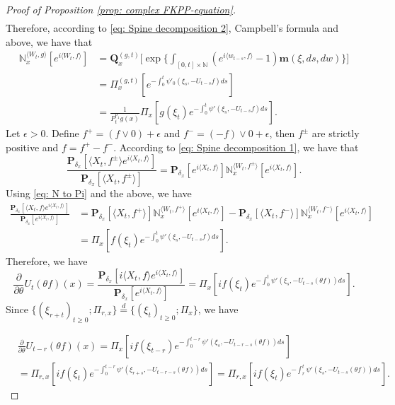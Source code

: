 \documentclass[12pt,a4paper]{amsart}
\theoremstyle{plain}
\theoremstyle{definition}
\numberwithin{equation}{section}
\begin{document}
\begin{proof}[Proof of Proposition \ref{prop: complex FKPP-equation}]
\begin{align}
\end{align}
    Therefore, according to \eqref{eq: Spine decomposition 2}, Campbell's formula and above, we have that
\begin{align}
\label{eq: N to Pi}
    \mathbb N_x^{\langle W_{t}, g\rangle}[e^{i \langle W_t, f\rangle}]
    &=\mathbf Q_x^{(g,t)} \Big[\exp\Big\{\int_{[0,t]\times \mathbb N}(e^{i \langle w_{t-s}, f\rangle} - 1) \mathbf m(\xi, ds,dw)\Big\}\Big]
    \\&= \Pi_x^{(g,t)} [e^{-\int_0^t \psi'_0(\xi_s, -U_{t-s}f)ds}]
    \\&= \frac{1}{P_t^{\rho_1} g (x)} \Pi_x[ g(\xi_t) e^{-\int_0^t \psi'(\xi_s, -U_{t-s}f)ds} ].
\end{align}
    Let $\epsilon >0$.
    Define $f^+ = (f \vee 0) + \epsilon$ and $f^- = (-f) \vee 0 + \epsilon$, then $f^\pm$ are strictly positive and $f = f^+ - f^-$.
    According to \eqref{eq: Spine decomposition 1}, we have that
\begin{equation}
    \frac{\mathbf P_{\delta_x}[\langle X_t,f^{\pm}\rangle e^{i \langle X_t,f\rangle}]}{\mathbf P_{\delta_x}[\langle X_t,f^{\pm}\rangle ]}
    = \mathbf P_{\delta_x}[e^{i \langle X_t,f\rangle}] \mathbb N_x^{\langle W_t,f^{\pm}\rangle}[e^{i \langle X_t,f\rangle}].
\end{equation}
    Using \eqref{eq: N to Pi} and the above, we have
\begin{align}
    \frac{\mathbf P_{\delta_x}[\langle X_t, f\rangle e^{i \langle X_t, f\rangle}] }{\mathbf P_{\delta_x}[e^{i \langle X_t, f\rangle}]}
    &= \mathbf P_{\delta_x}[\langle X_t, f^+\rangle] \mathbb N_x^{\langle W_t, f^+\rangle} [e^{i \langle X_t, f\rangle}] - \mathbf P_{\delta_x}[\langle X_t, f^-\rangle]\mathbb N_x^{\langle W_t, f^-\rangle}[e^{i \langle X_t, f\rangle}]
    \\& = \Pi_x[ f(\xi_t) e^{- \int_0^t \psi'(\xi_s, -U_{t-s}f) ds}  ].
\end{align}
    Therefore, we have
\begin{equation}
    \frac{\partial}{\partial \theta} {U_t(\theta f)(x)}
    = \frac{\mathbf P_{\delta_x}[i\langle X_t, f\rangle e^{i \langle X_t, f\rangle}] }{\mathbf P_{\delta_x}[e^{i \langle X_t, f\rangle}]}
    =  \Pi_x[ if(\xi_t) e^{ - \int_0^t \psi'(\xi_s, -U_{t-s}(\theta f)) ds} ].
\end{equation}
    Since $\{(\xi_{r+t})_{t \geq 0}; \Pi_{r,x}\} \overset{d}{=} \{(\xi_{t})_{t\geq 0}; \Pi_{x}\} $, we have

\begin{align}
    &\frac{\partial}{\partial \theta} U_{t-r}(\theta f)( x)
    = \Pi_x[ i f(\xi_{t-r}) e^{-\int_0^{t-r} \psi'(\xi_s, -U_{t-r-s}(\theta f)) ds} ]
    \\&= \Pi_{r,x}[i f(\xi_t)e^{-\int_0^{t-r} \psi'(\xi_{r+s}, -U_{t-r-s}(\theta f)) ds} ]
    = \Pi_{r,x}[if(\xi_t)e^{-\int_r^t \psi'(\xi_{s}, -U_{t-s}(\theta f)) ds} ].
\end{align}


\end{proof}
\end{document}
